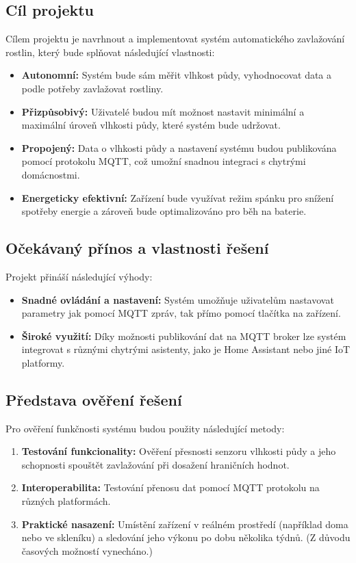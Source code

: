 \documentclass[a4paper, 11pt]{article}
\begin{document}
\subsection{Cíl projektu}
Cílem projektu je navrhnout a implementovat systém automatického zavlažování rostlin, který bude splňovat následující vlastnosti:
\begin{itemize}
    \item \textbf{Autonomní:} Systém bude sám měřit vlhkost půdy, vyhodnocovat data a podle potřeby zavlažovat rostliny.
    \item \textbf{Přizpůsobivý:} Uživatelé budou mít možnost nastavit minimální a maximální úroveň vlhkosti půdy, které systém bude udržovat.
    \item \textbf{Propojený:} Data o vlhkosti půdy a nastavení systému budou publikována pomocí protokolu MQTT, což umožní snadnou integraci s chytrými domácnostmi.
    \item \textbf{Energeticky efektivní:} Zařízení bude využívat režim spánku pro snížení spotřeby energie a zároveň bude optimalizováno pro běh na baterie.
\end{itemize}

\subsection{Očekávaný přínos a vlastnosti řešení}
Projekt přináší následující výhody:
\begin{itemize}
    \item \textbf{Snadné ovládání a nastavení:} Systém umožňuje uživatelům nastavovat parametry jak pomocí MQTT zpráv, tak přímo pomocí tlačítka na zařízení.
    \item \textbf{Široké využití:} Díky možnosti publikování dat na MQTT broker lze systém integrovat s různými chytrými asistenty, jako je Home Assistant nebo jiné IoT platformy.
\end{itemize}

\subsection{Představa ověření řešení}
Pro ověření funkčnosti systému budou použity následující metody:
\begin{enumerate}
    \item \textbf{Testování funkcionality:} Ověření přesnosti senzoru vlhkosti půdy a jeho schopnosti spouštět zavlažování při dosažení hraničních hodnot.
    \item \textbf{Interoperabilita:} Testování přenosu dat pomocí MQTT protokolu na různých platformách.
    \item \textbf{Praktické nasazení:} Umístění zařízení v reálném prostředí (například doma nebo ve skleníku) a sledování jeho výkonu po dobu několika týdnů. (Z důvodu časových možností vynecháno.)
\end{enumerate}
\end{document}
